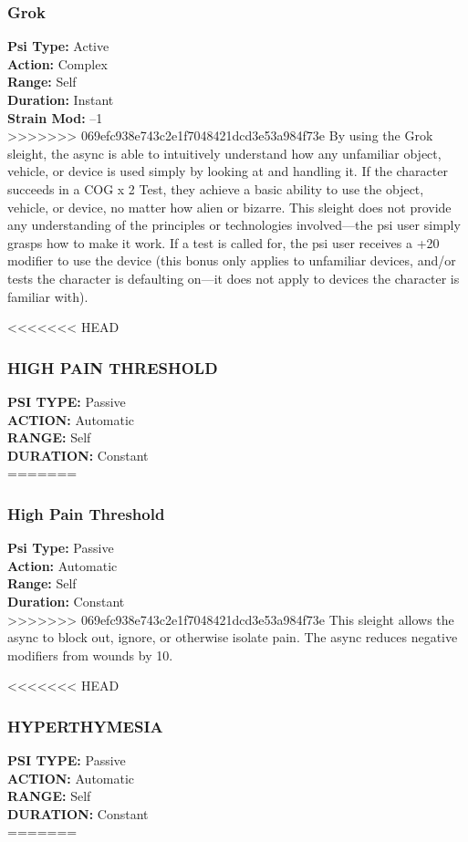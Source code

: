 \subsubsection{Grok}
\textbf{Psi Type:} Active \\ 
\textbf{Action:} Complex \\ 
\textbf{Range:} Self \\ 
\textbf{Duration:} Instant \\
\textbf{Strain Mod:} –1 \\
>>>>>>> 069efc938e743c2e1f7048421dcd3e53a984f73e
By using the Grok sleight, the async is able to
intuitively understand how any unfamiliar object,
vehicle, or device is used simply by looking at and
handling it. If the character succeeds in a COG x 2
Test, they achieve a basic ability to use the object,
vehicle, or device, no matter how alien or bizarre.
This sleight does not provide any understanding of
the principles or technologies involved—the psi user
simply grasps how to make it work. If a test is called
for, the psi user receives a +20 modifier to use the
device (this bonus only applies to unfamiliar devices,
and/or tests the character is defaulting on—it does not
apply to devices the character is familiar with).

<<<<<<< HEAD
\subsubsection{HIGH PAIN THRESHOLD}
\textbf{PSI TYPE:} Passive \\ 
\textbf{ACTION:} Automatic \\ 
\textbf{RANGE:} Self \\ 
\textbf{DURATION:} Constant \\
=======
\subsubsection{High Pain Threshold}
\textbf{Psi Type:} Passive \\ 
\textbf{Action:} Automatic \\ 
\textbf{Range:} Self \\ 
\textbf{Duration:} Constant \\
>>>>>>> 069efc938e743c2e1f7048421dcd3e53a984f73e
This sleight allows the async to block out, ignore, or
otherwise isolate pain. The async reduces negative
modifiers from wounds by 10.

<<<<<<< HEAD
\subsubsection{HYPERTHYMESIA}
\textbf{PSI TYPE:} Passive \\ 
\textbf{ACTION:} Automatic \\ 
\textbf{RANGE:} Self \\ 
\textbf{DURATION:} Constant \\
=======
